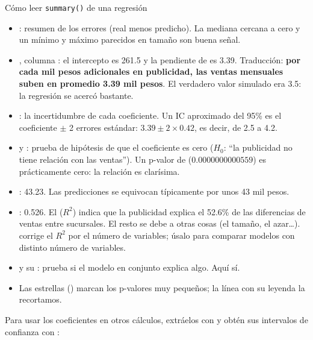 \begin{concepto}{Cómo leer \texttt{summary()} de una regresión}
\begin{itemize}
  \item {}: resumen de los errores (real menos predicho). La
        mediana cercana a cero y un mínimo y máximo parecidos en tamaño son
        buena señal.
  \item {}, columna : el intercepto es
        261.5 y la pendiente de  es 3.39. Traducción:
        \textbf{por cada mil pesos adicionales en publicidad, las ventas
        mensuales suben en promedio 3.39 mil pesos}. El verdadero valor
        simulado era 3.5: la regresión se acercó bastante.
  \item {}: la incertidumbre de cada coeficiente. Un IC
        aproximado del 95\% es el coeficiente $\pm$ 2 errores estándar:
        $3.39 \pm 2 \times 0.42$, es decir, de 2.5 a 4.2.
  \item {} y : prueba de hipótesis de que el
        coeficiente es cero ($H_0$: ``la publicidad no tiene relación con las
        ventas''). Un p-valor de  ($0.0000000000559$) es
        prácticamente cero: la relación es clarísima.
  \item {}: 43.23. Las predicciones se
        equivocan típicamente por unos 43 mil pesos.
  \item {}: 0.526. El  ($R^2$) indica que la publicidad explica el 52.6\% de
        las diferencias de ventas entre sucursales. El resto se debe a otras
        cosas (el tamaño, el azar\ldots). 
        corrige el $R^2$ por el número de variables; úsalo para comparar
        modelos con distinto número de variables.
  \item {} y su : prueba si el modelo en
        conjunto explica algo. Aquí sí.
  \item Las estrellas (\codigo{***}) marcan los p-valores muy pequeños; la
        línea  con su leyenda la recortamos.
\end{itemize}
\end{concepto}

Para usar los coeficientes en otros cálculos, extráelos con
 y obtén sus intervalos de confianza con :

